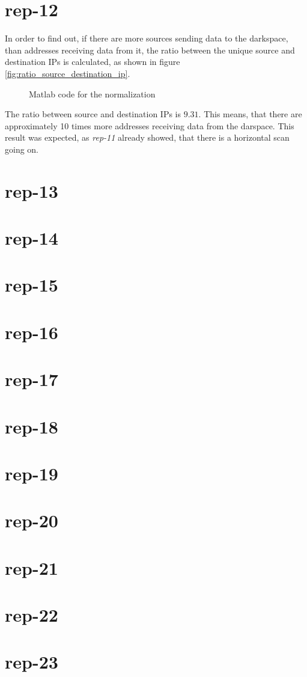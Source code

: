 \section*{rep-12}
In order to find out, if there are more sources sending data to the darkspace, than addresses receiving data from it, the ratio between the unique source and destination IPs is calculated, as shown in figure \ref{fig:ratio_source_destination_ip}.

\begin{figure}[H]

\caption{Matlab code for the normalization}
\label{fig:correlation}
\end{figure}

The ratio between source and destination IPs is $9.31$. This means, that there are approximately 10 times more addresses receiving data from the darspace. This result was expected, as \textit{rep-11} already showed, that there is a horizontal scan going on.

\section*{rep-13}

\section*{rep-14}

\section*{rep-15}

\section*{rep-16}

\section*{rep-17}

\section*{rep-18}

\section*{rep-19}

\section*{rep-20}

\section*{rep-21}

\section*{rep-22}

\section*{rep-23}

